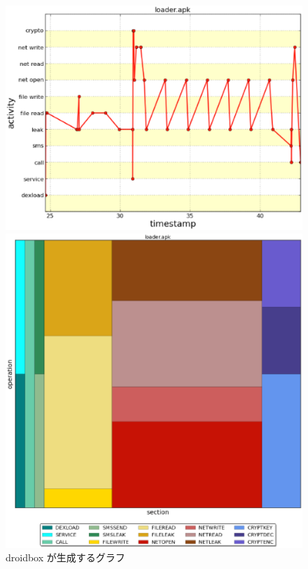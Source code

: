 \begin{figure}[t]
	\begin{minipage}{0.5\hsize}
	\begin{center}
		\graphicspath{{./epsfiles/}}
		\includegraphics[scale=0.2]{droidbox1.eps}
	\end{center}
	\end{minipage}
	\begin{minipage}{0.5\hsize}
	\begin{center}
		\graphicspath{{./epsfiles/}}	
		\includegraphics[scale=0.2]{droidbox2.eps}
	\end{center}
	\end{minipage}
\caption{droidbox  が生成するグラフ}
\label{droidboxgraph}
\end{figure}
\fi

